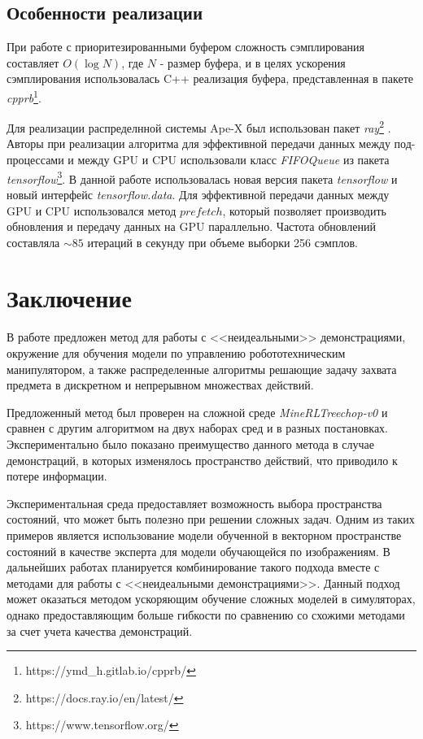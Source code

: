 \documentclass{mipt-thesis-bs}
\begin{document}
\section{Особенности реализации}

При работе с приоритезированными буфером сложность сэмплирования составляет $O(\operatorname{log}N)$, где $N$ - размер буфера, и в целях ускорения сэмплирования использовалась C++ реализация буфера, представленная в пакете \textit{cpprb}\footnote{https://ymd\_h.gitlab.io/cpprb/}.

Для реализации распределнной системы Ape-X \cite{apex} был использован пакет \textit{ray}\footnote{https://docs.ray.io/en/latest/} . Авторы \cite{apex} при реализации алгоритма для эффективной передачи данных между под-процессами и между GPU и CPU использовали класс \textit{FIFOQueue} из пакета \textit{tensorflow}\footnote{https://www.tensorflow.org/}. В данной работе использовалась новая версия пакета \textit{tensorflow} и новый интерфейс \textit{tensorflow.data}. Для эффективной передачи данных между GPU и CPU использовался метод $prefetch$, который позволяет производить обновления и передачу данных на GPU параллельно. Частота обновлений составляла $\sim85$ итераций в секунду при объеме выборки 256 сэмплов.

\backmatter

\chapter{Заключение}

В работе предложен метод для работы с <<неидеальными>> демонстрациями, окружение для обучения модели по управлению робототехническим манипулятором, а также распределенные алгоритмы решающие задачу захвата предмета в дискретном и непрерывном множествах действий. 

Предложенный метод был проверен на сложной среде \textit{MineRLTreechop-v0} и сравнен с другим алгоритмом на двух наборах сред и в разных постановках. Экспериментально было показано преимущество данного метода в случае демонстраций, в которых изменялось пространство действий, что приводило к потере информации.

Экспериментальная среда предоставляет возможность выбора пространства состояний, что может быть полезно при решении сложных задач. Одним из таких примеров является использование модели обученной в векторном пространстве состояний в качестве эксперта для модели обучающейся по изображениям. В дальнейших работах планируется комбинирование такого подхода вместе с методами для работы с <<неидеальными демонстрациями>>. Данный подход может оказаться методом ускоряющим обучение сложных моделей в симуляторах, однако предоставляющим больше гибкости по сравнению со схожими методами за счет учета качества демонстраций.  
\end{document}
